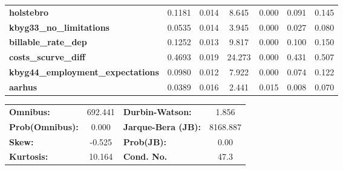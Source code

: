 \begin{center}
\begin{tabular}{lcccccc}
\textbf{holstebro}                        &       0.1181  &        0.014     &     8.645  &         0.000        &        0.091    &        0.145     \\
\textbf{kbyg33\_no\_limitations}          &       0.0535  &        0.014     &     3.945  &         0.000        &        0.027    &        0.080     \\
\textbf{billable\_rate\_dep}              &       0.1252  &        0.013     &     9.817  &         0.000        &        0.100    &        0.150     \\
\textbf{costs\_scurve\_diff}              &       0.4693  &        0.019     &    24.273  &         0.000        &        0.431    &        0.507     \\
\textbf{kbyg44\_employment\_expectations} &       0.0980  &        0.012     &     7.922  &         0.000        &        0.074    &        0.122     \\
\textbf{aarhus}                           &       0.0389  &        0.016     &     2.441  &         0.015        &        0.008    &        0.070     \\
\bottomrule
\end{tabular}
\begin{tabular}{lclc}
\textbf{Omnibus:}       & 692.441 & \textbf{  Durbin-Watson:     } &    1.856  \\
\textbf{Prob(Omnibus):} &   0.000 & \textbf{  Jarque-Bera (JB):  } & 8168.887  \\
\textbf{Skew:}          &  -0.525 & \textbf{  Prob(JB):          } &     0.00  \\
\textbf{Kurtosis:}      &  10.164 & \textbf{  Cond. No.          } &     47.3  \\
\bottomrule
\end{tabular}
\end{center}